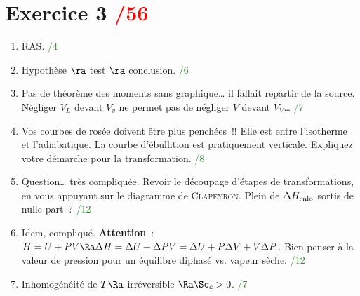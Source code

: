 \documentclass[a4paper, 11pt, final, garamond]{book}
\begin{document}
\section{Exercice 3 \hfill \textcolor{red}{/56}}
\begin{enumerate}
  \item RAS.
    \hfill \textcolor{ForestGreen}{/4}
  \item Hypothèse $\ra$ test $\ra$ conclusion.
    \hfill \textcolor{ForestGreen}{/6}
  \item Pas de théorème des moments sans graphique… il fallait repartir de la
    source. Négliger $V_L$ devant $V_v$ ne permet pas de négliger $V$ devant
    $V_V$…
    \hfill \textcolor{ForestGreen}{/7}
  \item {\Large Vos courbes de rosée doivent être plus penchées~!!} Elle est
    entre l'isotherme et l'adiabatique. La courbe d'ébullition est pratiquement
    verticale. Expliquez votre démarche pour la transformation.
    \hfill \textcolor{ForestGreen}{/8}
  \item Question… très compliquée. Revoir le découpage d'étapes de
    transformations, en vous appuyant sur le diagramme de \textsc{Clapeyron}.
    Plein de $\Delta{H}_{\rm calo}$ sortis de nulle part~?
    \hfill \textcolor{ForestGreen}{/12}
  \item Idem, compliqué. \textbf{Attention}~: $H = U + PV \Ra \Delta{H} =
    \Delta{U} + \Delta{PV} = \Delta{U} + P \Delta{V} + V \Delta{P}$. Bien penser
    à la valeur de pression pour un équilibre diphasé vs. vapeur sèche.
    \hfill \textcolor{ForestGreen}{/12}
  \item Inhomogénéité de $T \Ra$ irréversible $\Ra \Sc_c > 0$.
    \hfill \textcolor{ForestGreen}{/7}
\end{enumerate}
\end{document}
